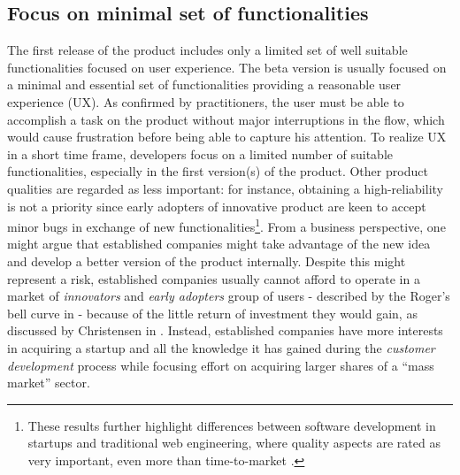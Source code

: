 \documentclass[10pt,journal,letterpaper,compsoc]{IEEEtran}
\begin{document}
\subsection{Focus on minimal set of functionalities}
The first release of the product includes only a limited set of well 
suitable functionalities focused on user experience. The beta version is usually 
focused on a minimal and essential set of functionalities providing a reasonable 
user experience (UX). 
As confirmed by practitioners, the user must be able to 
accomplish a task on the product without major interruptions in the flow, which 
would cause frustration before being able to capture his attention. To realize 
UX in a short time frame, developers focus on a limited number of suitable 
functionalities, especially in the first version(s) of the product. Other 
product qualities are regarded as less important: for instance, obtaining a 
high-reliability is not a priority since early adopters of innovative product 
are keen to accept minor bugs in exchange of new functionalities\footnote{These 
results further highlight differences between software development in startups 
and traditional web engineering, where quality aspects are rated as very 
important, even more than time-to-market \cite{Offutt2002}.}. From a business 
perspective, one might argue that established companies might take advantage of 
the new idea and develop a better version of the product internally.
Despite this might represent a risk, established companies usually cannot 
afford to operate in a market of \textit{innovators} and \textit{early adopters} 
group of users - described by the Roger's bell curve in \cite{Rogers} - because 
of the little return of investment they would gain, as discussed by Christensen 
in \cite{Christensen2003}. Instead, established companies have more interests 
in acquiring a startup and all the knowledge it has gained during the 
\textit{customer development} process while focusing effort on acquiring larger 
shares of a ``mass market'' sector. 
\end{document}
